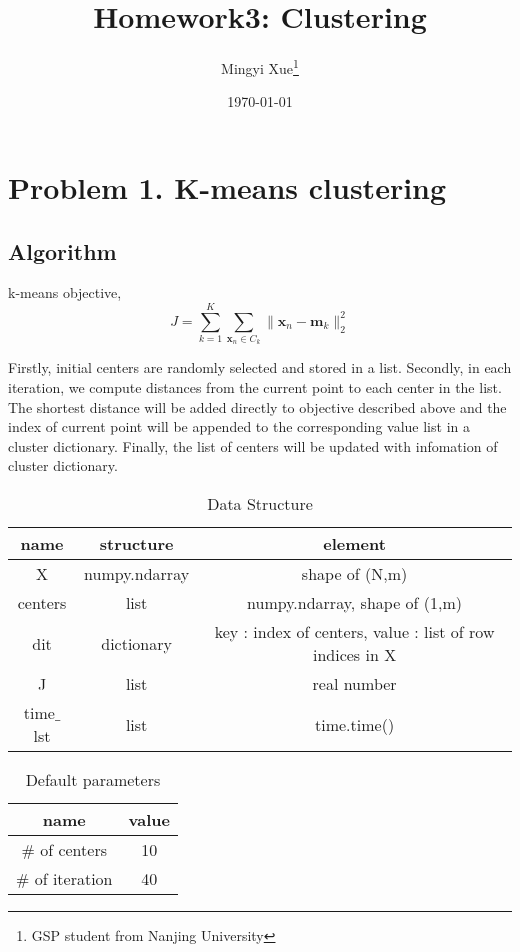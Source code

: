\documentclass[a4paper,11pt]{article}
\title{\Large\textbf{Homework3: Clustering}}
\author{Mingyi Xue\footnote{GSP student from Nanjing University}}
\begin{document}
\date{\today}
\maketitle
\section{Problem 1. K-means clustering}
\subsection{Algorithm}
k-means objective,\\
\begin{equation}
J = \sum_{k=1}^{K}\sum_{\bm{x}_{n}\in C_{k}}^{}\|\bm{x}_{n}-\bm{m}_{k}\|_{2}^{2}
\end{equation}
\par
Firstly, initial centers are randomly selected and stored in a list. Secondly, in each iteration, we compute distances from the current point to each center in the list. The shortest distance will be added directly to objective described above and the index of current point will be appended to the corresponding value list in a cluster dictionary. Finally, the list of centers will be updated with infomation of cluster dictionary.\par
\begin{table}[H]
	\begin{center}
		\caption{Data Structure}
		\begin{tabular}{ccc}
			\toprule[2pt] 
			name & structure&element\\
			\hline
			X      &numpy.ndarray&shape of (N,m)\\
			centers&list         &numpy.ndarray, shape of (1,m)\\
			dit    &dictionary   &key : index of centers, value : list of row indices in X\\
			J      &list         &real number\\
			time$\_$lst&list      &time.time()\\
			
			\bottomrule[2pt]
		\end{tabular} 
	\end{center}
\end{table}
\begin{table}[H]
	\begin{center}
		\caption{Default parameters}
		\begin{tabular}{cc}
			\toprule[2pt] 
			name & value\\
			\hline
			$\#$ of centers&10\\
			$\#$ of iteration&40\\
			\bottomrule[2pt]
		\end{tabular} 
	\end{center}
\end{table}
\end{document}

